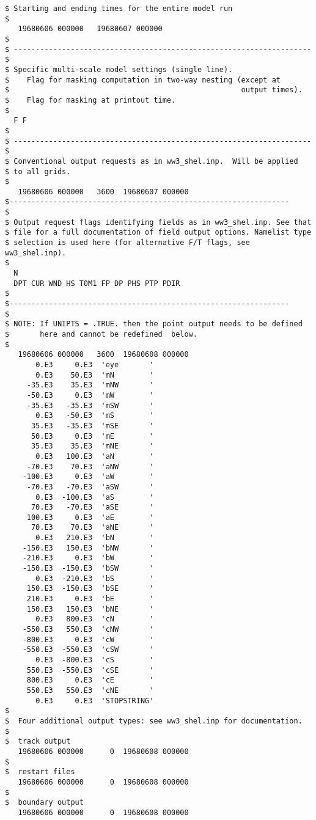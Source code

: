 \begin{footnotesize}
\begin{verbatim}
$ Starting and ending times for the entire model run
$
   19680606 000000   19680607 000000
$
$ -------------------------------------------------------------------- $
$ Specific multi-scale model settings (single line).
$    Flag for masking computation in two-way nesting (except at 
$                                                     output times).
$    Flag for masking at printout time.
$
  F F
$
$ -------------------------------------------------------------------- $
$ Conventional output requests as in ww3_shel.inp.  Will be applied
$ to all grids.
$
   19680606 000000   3600  19680607 000000
$----------------------------------------------------------------
$
$ Output request flags identifying fields as in ww3_shel.inp. See that
$ file for a full documentation of field output options. Namelist type
$ selection is used here (for alternative F/T flags, see ww3_shel.inp).
$
  N
  DPT CUR WND HS T0M1 FP DP PHS PTP PDIR
$
$----------------------------------------------------------------
$
$ NOTE: If UNIPTS = .TRUE. then the point output needs to be defined
$       here and cannot be redefined  below.
$
   19680606 000000   3600  19680608 000000
       0.E3     0.E3  'eye       '
       0.E3    50.E3  'mN        '
     -35.E3    35.E3  'mNW       '
     -50.E3     0.E3  'mW        '
     -35.E3   -35.E3  'mSW       '
       0.E3   -50.E3  'mS        '
      35.E3   -35.E3  'mSE       '
      50.E3     0.E3  'mE        '
      35.E3    35.E3  'mNE       '
       0.E3   100.E3  'aN        '
     -70.E3    70.E3  'aNW       '
    -100.E3     0.E3  'aW        '
     -70.E3   -70.E3  'aSW       '
       0.E3  -100.E3  'aS        '
      70.E3   -70.E3  'aSE       '
     100.E3     0.E3  'aE        '
      70.E3    70.E3  'aNE       '
       0.E3   210.E3  'bN        '
    -150.E3   150.E3  'bNW       '
    -210.E3     0.E3  'bW        '
    -150.E3  -150.E3  'bSW       '
       0.E3  -210.E3  'bS        '
     150.E3  -150.E3  'bSE       '
     210.E3     0.E3  'bE        '
     150.E3   150.E3  'bNE       '
       0.E3   800.E3  'cN        '
    -550.E3   550.E3  'cNW       '
    -800.E3     0.E3  'cW        '
    -550.E3  -550.E3  'cSW       '
       0.E3  -800.E3  'cS        '
     550.E3  -550.E3  'cSE       '
     800.E3     0.E3  'cE        '
     550.E3   550.E3  'cNE       '
       0.E3     0.E3  'STOPSTRING'
$
$  Four additional output types: see ww3_shel.inp for documentation.
$ 
$  track output
   19680606 000000      0  19680608 000000
$
$  restart files
   19680606 000000      0  19680608 000000
$
$  boundary output
   19680606 000000      0  19680608 000000

\end{verbatim}
\end{footnotesize}
